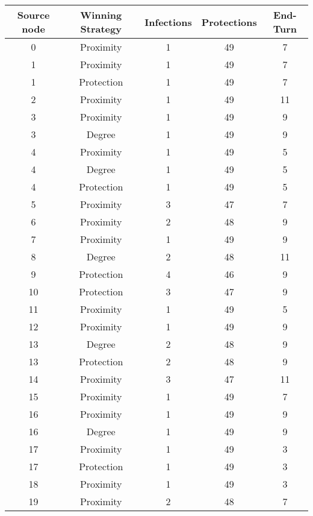 \documentclass[results.tex]{subfiles}
\begin{document}
\begin{center}
  \begin{tabular}{| c || c | c | c | c |}
    \hline
    {\bfseries Source node} & {\bfseries Winning Strategy} & {\bfseries Infections} & {\bfseries Protections} & {\bfseries End-Turn} \\  %
    \hline\hline
    0 & Proximity & 1 & 49 & 7 \\ 
    \hline
    1 & Proximity & 1 & 49 & 7 \\ 
    \hline
    1 & Protection & 1 & 49 & 7 \\ 
    \hline
    2 & Proximity & 1 & 49 & 11 \\ 
    \hline
    3 & Proximity & 1 & 49 & 9 \\ 
    \hline
    3 & Degree & 1 & 49 & 9 \\ 
    \hline
    4 & Proximity & 1 & 49 & 5 \\ 
    \hline
    4 & Degree & 1 & 49 & 5 \\ 
    \hline
    4 & Protection & 1 & 49 & 5 \\ 
    \hline
    5 & Proximity & 3 & 47 & 7 \\ 
    \hline
    6 & Proximity & 2 & 48 & 9 \\ 
    \hline
    7 & Proximity & 1 & 49 & 9 \\ 
    \hline
    8 & Degree & 2 & 48 & 11 \\ 
    \hline
    9 & Protection & 4 & 46 & 9 \\ 
    \hline
    10 & Protection & 3 & 47 & 9 \\ 
    \hline
    11 & Proximity & 1 & 49 & 5 \\ 
    \hline
    12 & Proximity & 1 & 49 & 9 \\ 
    \hline
    13 & Degree & 2 & 48 & 9 \\ 
    \hline
    13 & Protection & 2 & 48 & 9 \\ 
    \hline
    14 & Proximity & 3 & 47 & 11 \\ 
    \hline
    15 & Proximity & 1 & 49 & 7 \\ 
    \hline
    16 & Proximity & 1 & 49 & 9 \\ 
    \hline
    16 & Degree & 1 & 49 & 9 \\ 
    \hline
    17 & Proximity & 1 & 49 & 3 \\ 
    \hline
    17 & Protection & 1 & 49 & 3 \\ 
    \hline
    18 & Proximity & 1 & 49 & 3 \\ 
    \hline
    19 & Proximity & 2 & 48 & 7 \\ 

\end{tabular}
\end{center}
\end{document}
